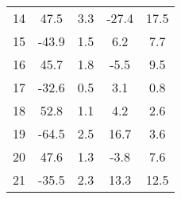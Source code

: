 \begin{tabular}{rSSSS}
        14 &                47.5 &                        3.3 &                           -27.4 &                                   17.5 \\
        15 &               -43.9 &                        1.5 &                             6.2 &                                    7.7 \\
        16 &                45.7 &                        1.8 &                            -5.5 &                                    9.5 \\
        17 &               -32.6 &                        0.5 &                             3.1 &                                    0.8 \\
        18 &                52.8 &                        1.1 &                             4.2 &                                    2.6 \\
        19 &               -64.5 &                        2.5 &                            16.7 &                                    3.6 \\
        20 &                47.6 &                        1.3 &                            -3.8 &                                    7.6 \\
        21 &               -35.5 &                        2.3 &                            13.3 &                                   12.5 \\
\bottomrule
\end{tabular}
